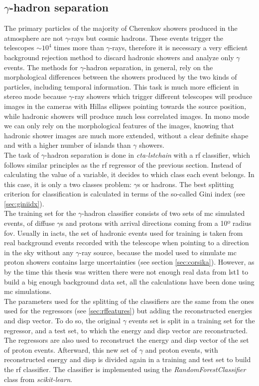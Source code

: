 \documentclass[main.tex]{subfiles}
\begin{document}
\subsection{$\gamma$-hadron separation} \label{sec:gammahsep}

The primary particles of the majority of Cherenkov showers produced in the atmosphere are not $\gamma$-rays but cosmic hadrons. These events trigger the telescopes $\sim 10^4$ times more than $\gamma$-rays, therefore it is necessary a very efficient background rejection method to discard hadronic showers and analyze only $\gamma$ events. The methods for $\gamma$-hadron separation, in general, rely on the morphological differences between the showers produced by the two kinds of particles, including temporal information. This task is much more efficient in stereo mode because $\gamma$-ray showers which trigger different telescopes will produce images in the cameras with Hillas ellipses pointing towards the source position, while hadronic showers will produce much less correlated images. In mono mode we can only rely on the morphological features of the images, knowing that hadronic shower images are much more extended, without a clear definite shape and with a higher number of islands than $\gamma$ showers.\\
The task of $\gamma$-hadron separation is done in \textit{cta-lstchain} with a \gls{rf} classifier, which follows similar principles as the \gls{rf} regressor of the previous section. Instead of calculating the value of a variable, it decides to which class each event belongs. In this case, it is only a two classes problem: $\gamma$s or hadrons. The best splitting criterion for classification is calculated in terms of the so-called Gini index (see \ref{sec:giniidx}).\\
The training set for the $\gamma$-hadron classifier consists of two sets of \gls{mc} simulated events, of diffuse $\gamma$s and protons with arrival directions coming from a 10º radius \gls{fov}. Usually in \glspl{iact}, the set of hadronic events used for training is taken from real background events recorded with the telescope when pointing to a direction in the sky without any $\gamma$-ray source, because the model used to simulate \gls{mc} proton showers contains large uncertainties (see section \ref{sec:corsika}). However, as by the time this thesis was written there were not enough real data from \gls{lst}1 to build a big enough background data set, all the calculations have been done using \gls{mc} simulations.\\
The parameters used for the splitting of the classifiers are the same from the ones used for the regressors (see \ref{sec:rffeatures}) but adding the reconstructed energies and disp vector. To do so, the original $\gamma$ events set is split in a training set for the regressor, and a test set, to which the energy and disp vector are reconstructed. The regressors are also used to reconstruct the energy and disp vector of the set of proton events. Afterward, this new set of $\gamma$ and proton events, with reconstructed energy and disp is divided again in a training and test set to build the \gls{rf} classifier.
The classifier is implemented using the \textit{RandomForestClassifier} class from \textit{scikit-learn}.
\end{document}
